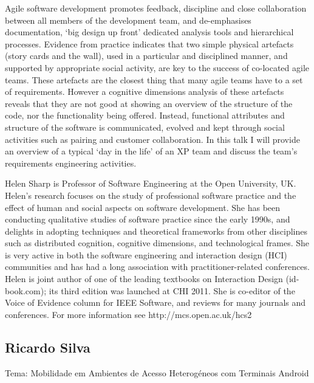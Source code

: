 Agile software development promotes feedback, discipline and close collaboration between all members of the development team, and de-emphasises documentation, ‘big design up front’ dedicated analysis tools and hierarchical processes. Evidence from practice indicates that two simple physical artefacts (story cards and the wall), used in a particular and disciplined manner, and supported by appropriate social activity, are key to the success of co-located agile teams. These artefacts are the closest thing that many agile teams have to a set of requirements. However a cognitive dimensions analysis of these artefacts reveals that they are not good at showing an overview of the structure of the code, nor the functionality being offered. Instead, functional attributes and structure of the software is communicated, evolved and kept through social activities such as pairing and customer collaboration. In this talk I will provide an overview of a typical ‘day in the life’ of an XP team and discuss the team’s requirements engineering activities.

Helen Sharp is Professor of Software Engineering at the Open University, UK. Helen’s research focuses on the study of professional software practice and the effect of human and social aspects on software development. She has been conducting qualitative studies of software practice since the early 1990s, and delights in adopting techniques and theoretical frameworks from other disciplines such as distributed cognition, cognitive dimensions, and technological frames. She is very active in both the software engineering and interaction design (HCI) communities and has had a long association with practitioner-related conferences. Helen is joint author of one of the leading textbooks on Interaction Design (id-book.com); its third edition was launched at CHI 2011. She is co-editor of the Voice of Evidence column for IEEE Software, and reviews for many journals and conferences. For more information see http://mcs.open.ac.uk/hcs2

\subsection{Ricardo Silva}
Tema: Mobilidade em Ambientes de Acesso Heterogéneos com Terminais Android

